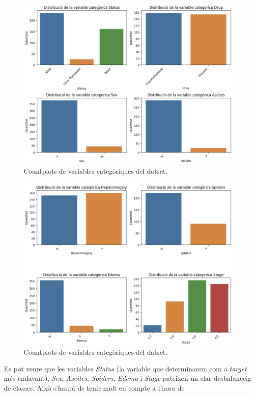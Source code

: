 \begin{figure}[H]
    \centering
    \includegraphics[width=\linewidth]{img/cat-countplots-1.png}
    \caption{Countplots de variables categòriques del datset.}
    \label{fig:cat-countplots-1}
\end{figure}
\begin{figure}[H]
    \centering
    \includegraphics[width=\linewidth]{img/cat-countplots-2.png}
    \caption{Countplots de variables categòriques del datset.}
    \label{fig:cat-countplots-2}
\end{figure}

Es pot veure que les variables \textit{Status} (la variable que determinarem com a \textit{target} més endavant), \textit{Sex}, \textit{Ascites}, \textit{Spiders}, \textit{Edema} i \textit{Stage} pateixen un clar desbalanceig de classes. Això s'haurà de tenir molt en compte a l'hora de 

